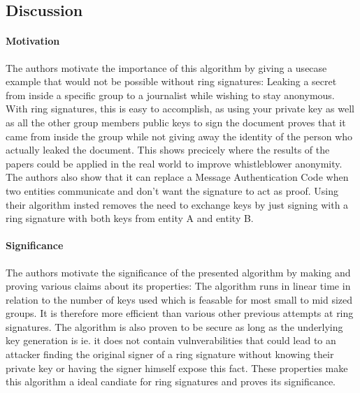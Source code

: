 \documentclass{scrartcl}
\begin{document}
\subsection{Discussion}
\paragraph{Motivation}{
The authors motivate the importance of this algorithm by giving a usecase example that would not be possible without ring signatures: Leaking a secret from inside a specific group to a journalist while wishing to stay anonymous. With ring signatures, this is easy to accomplish, as using your private key as well as all the other group members public keys to sign the document proves that it came from inside the group while not giving away the identity of the person who actually leaked the document. This shows precicely where the results of the papers could be applied in the real world to improve whistleblower anonymity. The authors also show that it can replace a Message Authentication Code when two entities communicate and don't want the signature to act as proof. Using their algorithm insted removes the need to exchange keys by just signing with a ring signature with both keys from entity A and entity B.
}
\paragraph{Significance}{
The authors motivate the significance of the presented algorithm by making and proving various claims about its properties:
The algorithm runs in linear time in relation to the number of keys used which is feasable for most small to mid sized groups. It is therefore more efficient than various other previous attempts at ring signatures.
The algorithm is also proven to be secure as long as the underlying key generation is ie. it does not contain vulnverabilities that could lead to an attacker finding the original signer of a ring signature without knowing their private key or having the signer himself expose this fact.
These properties make this algorithm a ideal candiate for ring signatures and proves its significance.
}
\end{document}
